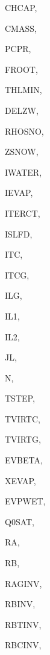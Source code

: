 {\begin{DoxyParamCaption}
\item[{real, dimension (ilg)}]{C\+H\+C\+A\+P, }
\item[{real, dimension (ilg)}]{C\+M\+A\+S\+S, }
\item[{real, dimension  (ilg)}]{P\+C\+P\+R, }
\item[{real, dimension (ilg,ig)}]{F\+R\+O\+O\+T, }
\item[{real, dimension(ilg,ig)}]{T\+H\+L\+M\+I\+N, }
\item[{real, dimension(ilg,ig)}]{D\+E\+L\+Z\+W, }
\item[{real, dimension(ilg)}]{R\+H\+O\+S\+N\+O, }
\item[{real, dimension (ilg)}]{Z\+S\+N\+O\+W, }
\item[{integer, dimension(ilg)}]{I\+W\+A\+T\+E\+R, }
\item[{integer, dimension (ilg)}]{I\+E\+V\+A\+P, }
\item[{integer, dimension(ilg,6,50)}]{I\+T\+E\+R\+C\+T, }
\item[{integer}]{I\+S\+L\+F\+D, }
\item[{integer}]{I\+T\+C, }
\item[{integer}]{I\+T\+C\+G, }
\item[{integer}]{I\+L\+G, }
\item[{integer}]{I\+L1, }
\item[{integer}]{I\+L2, }
\item[{integer}]{J\+L, }
\item[{integer}]{N, }
\item[{real, dimension (ilg)}]{T\+S\+T\+E\+P, }
\item[{real, dimension(ilg)}]{T\+V\+I\+R\+T\+C, }
\item[{real, dimension(ilg)}]{T\+V\+I\+R\+T\+G, }
\item[{real, dimension(ilg)}]{E\+V\+B\+E\+T\+A, }
\item[{real, dimension (ilg)}]{X\+E\+V\+A\+P, }
\item[{real, dimension(ilg)}]{E\+V\+P\+W\+E\+T, }
\item[{real, dimension (ilg)}]{Q0\+S\+A\+T, }
\item[{real, dimension    (ilg)}]{R\+A, }
\item[{real, dimension    (ilg)}]{R\+B, }
\item[{real, dimension(ilg)}]{R\+A\+G\+I\+N\+V, }
\item[{real, dimension (ilg)}]{R\+B\+I\+N\+V, }
\item[{real, dimension(ilg)}]{R\+B\+T\+I\+N\+V, }
\item[{real, dimension(ilg)}]{R\+B\+C\+I\+N\+V, }

\end{DoxyParamCaption}}

